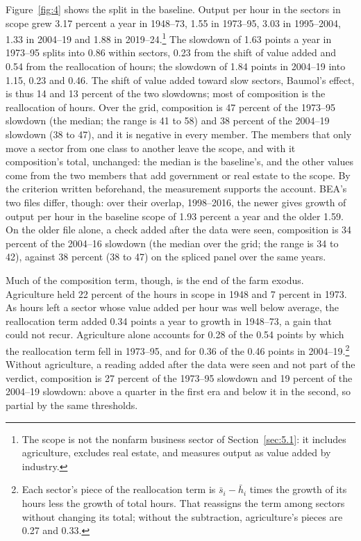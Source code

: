 \documentclass[12pt]{article}
\theoremstyle{plain}
\begin{document}
Figure~\ref{fig:4} shows the split in the baseline. Output per hour in the sectors in scope grew 3.17 percent a year in 1948--73, 1.55 in 1973--95, 3.03 in 1995--2004, 1.33 in 2004--19 and 1.88 in 2019--24.\footnote{The scope is not the nonfarm business sector of Section~\ref{sec:5.1}: it includes agriculture, excludes real estate, and measures output as value added by industry.} The slowdown of 1.63 points a year in 1973--95 splits into 0.86 within sectors, 0.23 from the shift of value added and 0.54 from the reallocation of hours; the slowdown of 1.84 points in 2004--19 into 1.15, 0.23 and 0.46. The shift of value added toward slow sectors, Baumol's effect, is thus 14 and 13 percent of the two slowdowns; most of composition is the reallocation of hours. Over the grid, composition is 47 percent of the 1973--95 slowdown (the median; the range is 41 to 58) and 38 percent of the 2004--19 slowdown (38 to 47), and it is negative in every member. The members that only move a sector from one class to another leave the scope, and with it composition's total, unchanged: the median is the baseline's, and the other values come from the two members that add government or real estate to the scope. By the criterion written beforehand, the measurement supports the account. BEA's two files differ, though: over their overlap, 1998--2016, the newer gives growth of output per hour in the baseline scope of 1.93 percent a year and the older 1.59. On the older file alone, a check added after the data were seen, composition is 34 percent of the 2004--16 slowdown (the median over the grid; the range is 34 to 42), against 38 percent (38 to 47) on the spliced panel over the same years.

Much of the composition term, though, is the end of the farm exodus. Agriculture held 22 percent of the hours in scope in 1948 and 7 percent in 1973. As hours left a sector whose value added per hour was well below average, the reallocation term added 0.34 points a year to growth in 1948--73, a gain that could not recur. Agriculture alone accounts for 0.28 of the 0.54 points by which the reallocation term fell in 1973--95, and for 0.36 of the 0.46 points in 2004--19.\footnote{Each sector's piece of the reallocation term is $\bar s_i-\bar h_i$ times the growth of its hours less the growth of total hours. That reassigns the term among sectors without changing its total; without the subtraction, agriculture's pieces are 0.27 and 0.33.} Without agriculture, a reading added after the data were seen and not part of the verdict, composition is 27 percent of the 1973--95 slowdown and 19 percent of the 2004--19 slowdown: above a quarter in the first era and below it in the second, so partial by the same thresholds.
\end{document}
